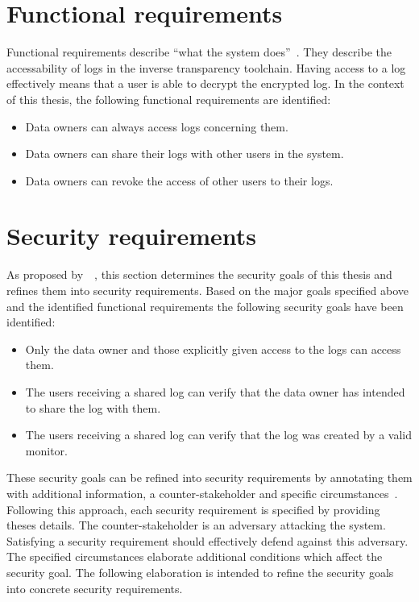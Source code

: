 \documentclass[../main.tex]{subfiles}
\begin{document}
\section{Functional requirements}\label{functional-requriements}
Functional requirements describe \enquote{what the system does}~\cite[11]{Mylopoulos1992}.
They describe the accessability of logs in the inverse transparency toolchain.
Having access to a log effectively means that a user is able to decrypt the encrypted log.
In the context of this thesis, the following functional requirements are identified:
\begin{itemize}
    \item Data owners can always access logs concerning them.
    \item Data owners can share their logs with other users in the system.
    \item Data owners can revoke the access of other users to their logs.
\end{itemize}

\section{Security requirements}\label{security-requriements}
As proposed by~\citeauthor{Fabian2010}~\cite{Fabian2010}, this section determines the security goals of this thesis and refines them into security requirements.
Based on the major goals specified above and the identified functional requirements the following security goals have been identified:
\begin{itemize}
    \item Only the data owner and those explicitly given access to the logs can access them.
    \item The users receiving a shared log can verify that the data owner has intended to share the log with them.
    \item The users receiving a shared log can verify that the log was created by a valid monitor.
\end{itemize}

These security goals can be refined into security requirements by annotating them with additional information, a counter-stakeholder and specific circumstances~\cite{Fabian2010}.
Following this approach, each security requirement is specified by providing theses details.
The counter-stakeholder is an adversary attacking the system.
Satisfying a security requirement should effectively defend against this adversary.
The specified circumstances elaborate additional conditions which affect the security goal.
The following elaboration is intended to refine the security goals into concrete security requirements.
\end{document}
